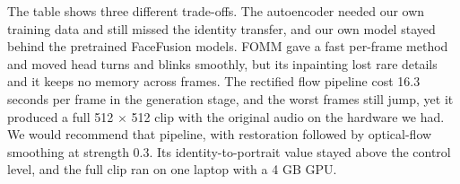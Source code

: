 The table shows three different trade-offs. The autoencoder needed our own
training data and still missed the identity transfer, and our own model stayed
behind the pretrained FaceFusion models. FOMM gave a fast per-frame method and
moved head turns and blinks smoothly, but its inpainting lost rare details and
it keeps no memory across frames. The rectified flow pipeline cost 16.3 seconds
per frame in the generation stage, and the worst frames still jump, yet it
produced a full 512 $\times$ 512 clip with the original audio on the hardware we
had. We would recommend that pipeline, with restoration followed by
optical-flow smoothing at strength 0.3. Its identity-to-portrait value stayed
above the control level, and the full clip ran on one laptop with a 4 GB GPU.
